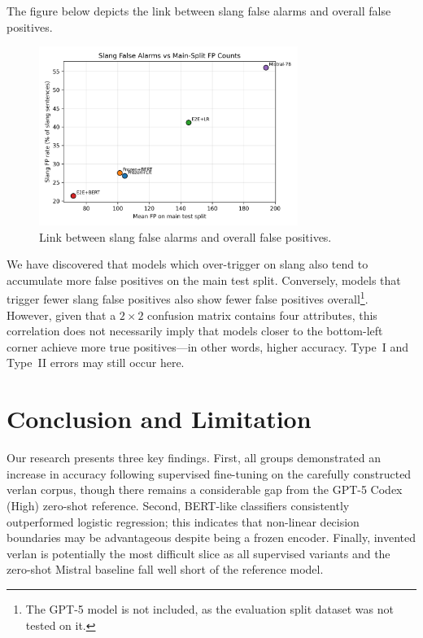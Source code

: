 \documentclass[12pt]{article}
\begin{document}
The figure below depicts the link between slang false alarms and overall false positives.

\begin{figure}[H]
    \centering
    \includegraphics[width=0.75\textwidth]{figures/slang_fp_vs_main_fp.png}
    \caption{Link between slang false alarms and overall false positives.}
    \label{fig:slang-fp-correlation}
\end{figure}

We have discovered that models which over-trigger on slang also tend to accumulate more false positives on the main test split. 
Conversely, models that trigger fewer slang false positives also show fewer false positives overall\footnote{The GPT-5 model is not included, as the evaluation split dataset was not tested on it.}. 
However, given that a $2 \times 2$ confusion matrix contains four attributes, this correlation does not necessarily imply that models closer to the bottom-left corner achieve more true positives\;---\;in other words, higher accuracy. 
Type~I and Type~II errors may still occur here.

\section{Conclusion and Limitation}

Our research presents three key findings. First, all groups demonstrated an increase in accuracy following supervised fine-tuning on the carefully constructed verlan corpus, though there remains a considerable gap from the GPT-5 Codex (High) zero-shot reference. Second, BERT-like classifiers consistently outperformed logistic regression; this indicates that non-linear decision boundaries may be advantageous despite being a frozen encoder. Finally, invented verlan is potentially the most difficult slice as all supervised variants and the zero-shot Mistral baseline fall well short of the reference model.
\end{document}
